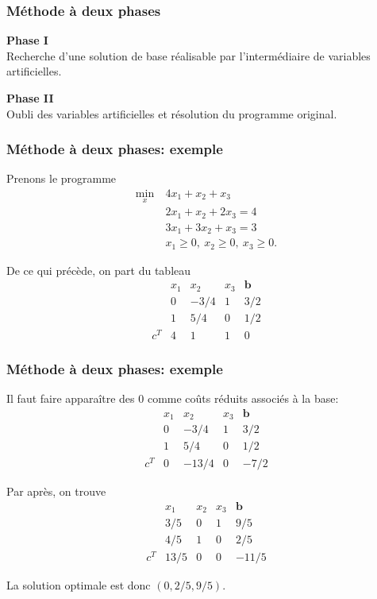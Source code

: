 \documentclass[usepdftitle=false]{beamer}
\def\bb{\boldsymbol{b}}
\begin{document}
\begin{frame}
\frametitle{Méthode à deux phases}

\textbf{Phase I}\\
Recherche d'une solution de base réalisable par l'intermédiaire de variables artificielles.

\mbox{}

\textbf{Phase II}\\
Oubli des variables artificielles et résolution du programme original.

\end{frame}

\begin{frame}
\frametitle{Méthode à deux phases: exemple}

Prenons le programme
\begin{align*}
\min_x \ & 4x_1 + x_2 + x_3 \\
& 2x_1 + x_2 + 2x_3 = 4 \\
& 3x_1 + 3x_2 + x_3 = 3 \\
& x_1 \geq 0,\ x_2 \geq 0,\ x_3 \geq 0.
\end{align*}

\mbox{}

De ce qui précède, on part du tableau
\[
\begin{matrix}
& x_1 & x_2 & x_3  & \bb \\
& 0 & -3/4 & 1 & 3/2 \\
& 1 & 5/4 & 0 & 1/2 \\
c^T & 4 & 1 & 1 & 0
\end{matrix}
\]
\end{frame}

\begin{frame}
\frametitle{Méthode à deux phases: exemple}

Il faut faire apparaître des 0 comme coûts réduits associés à la base:
\[
\begin{matrix}
& x_1 & x_2 & x_3  & \bb \\
& 0 & -3/4 & 1 & 3/2 \\
& 1 & 5/4 & 0 & 1/2 \\
c^T & 0 & -13/4 & 0 & -7/2
\end{matrix}
\]

\mbox{}

Par après, on trouve
\[
\begin{matrix}
& x_1 & x_2 & x_3  & \bb \\
& 3/5 & 0 & 1 & 9/5 \\
& 4/5 & 1 & 0 & 2/5 \\
c^T & 13/5 & 0 & 0 & -11/5
\end{matrix}
\]

\mbox{}

La solution optimale est donc $(0, 2/5, 9/5)$.

\end{frame}
\end{document}
